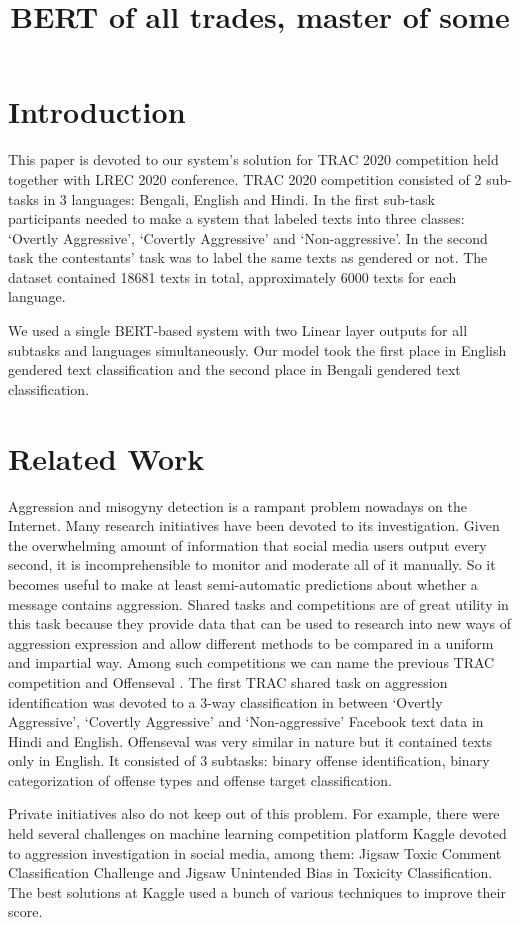 \documentclass[10pt, a4paper]{article}
\title{{BERT of all trades, master of some}}
\begin{document}
\maketitleabstract


\section{Introduction}
\label{intro}
This paper is devoted to our system's solution for TRAC 2020 competition held together with LREC 2020 conference. TRAC 2020 competition consisted of 2 sub-tasks in 3 languages: Bengali, English and Hindi. In the first sub-task participants needed to make a system that labeled texts into three classes: ‘Overtly Aggressive’, ‘Covertly Aggressive’ and ‘Non-aggressive’. In the second task the contestants' task was to label the same texts as gendered or not. The dataset contained 18681 texts in total, approximately 6000 texts for each language.

We used a single BERT-based system with two Linear layer outputs for all subtasks and languages simultaneously. Our model took the first place in English gendered text classification and the second place in Bengali gendered text classification.

\section{Related Work}
Aggression and misogyny detection is a rampant problem nowadays on the Internet. Many research initiatives have been devoted to its investigation. Given the overwhelming amount of information that social media users output every second, it is incomprehensible to monitor and moderate all of it manually. So it becomes useful to make at least semi-automatic predictions about whether a message contains aggression. Shared tasks and competitions are of great utility in this task because they provide data that can be used to research into new ways of aggression expression and allow different methods to be compared in a uniform and impartial way. Among such competitions we can name the previous TRAC competition \cite{trac2018report} and Offenseval \cite{offenseval}. The first TRAC shared task on aggression identification was devoted to a 3-way classification in between ‘Overtly Aggressive’, ‘Covertly Aggressive’ and ‘Non-aggressive’ Facebook text data in Hindi and English. Offenseval was very similar in nature but it contained texts only in English. It consisted of 3 subtasks: binary offense identification, binary categorization of offense types and offense target classification.

Private initiatives also do not keep out of this problem. For example, there were held several challenges on machine learning competition platform Kaggle devoted to aggression investigation in social media, among them: Jigsaw Toxic Comment Classification Challenge and Jigsaw Unintended Bias in Toxicity Classification. The best solutions at Kaggle used a bunch of various techniques to improve their score.
\end{document}
